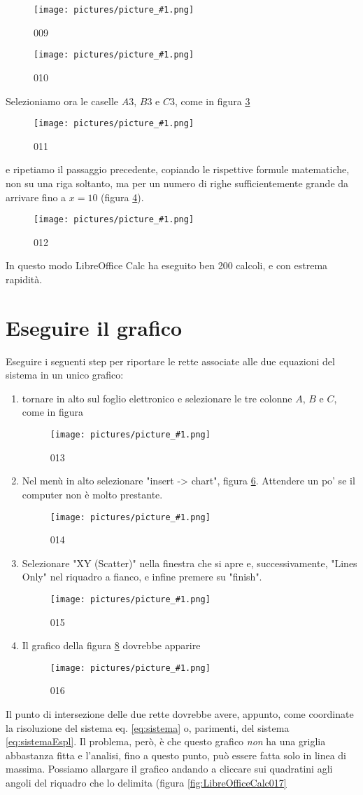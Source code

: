 \documentclass[17pt]{extarticle}
\newcommand{\pict}[1]{
\begin{figure}[h!]		
	\centering
   	\texttt{[image: pictures/picture\_\#1.png]}
  	\caption{#1}
   	\label{fig:LibreOfficeCalc#1}
\end{figure}
}
\begin{document}
%
\pict{009}

%
\pict{010}

Selezioniamo ora le caselle $A3$, $B3$ e $C3$, come in figura \ref{fig:LibreOfficeCalc011}

%
\pict{011}

e ripetiamo il passaggio precedente, copiando le rispettive formule matematiche, non su una riga soltanto, ma per un numero di righe sufficientemente grande da arrivare fino a $x = 10$ (figura \ref{fig:LibreOfficeCalc012}).

%
\pict{012}

In questo modo LibreOffice Calc ha eseguito ben 200 calcoli, e con estrema rapidità.

\newpage
\mbox{}
\newpage

\mbox{}
\newpage

\section{Eseguire il grafico}


Eseguire i seguenti step per riportare le rette associate alle due equazioni del sistema in un unico grafico:

\begin{enumerate}
	\item tornare in alto sul foglio elettronico e selezionare le tre colonne $A$, $B$ e $C$, come in figura 
	
	\pict{013}	
		
	\item Nel menù in alto selezionare "insert -> chart", figura \ref{fig:LibreOfficeCalc014}. Attendere un po' se il computer non è molto prestante.
	
	\pict{014}	
	
	\item Selezionare "XY (Scatter)" nella finestra che si apre e, successivamente, "Lines Only" nel riquadro a fianco, e infine premere su "finish".
	
	\pict{015}
	
	\item Il grafico della figura \ref{fig:LibreOfficeCalc016} dovrebbe apparire

	\pict{016}

\end{enumerate}
Il punto di intersezione delle due rette dovrebbe avere, appunto, come coordinate la risoluzione del sistema eq. \ref{eq:sistema} o, parimenti, del sistema \ref{eq:sistemaEspl}. Il problema, però, è che questo grafico \emph{non} ha una griglia abbastanza fitta e l'analisi, fino a questo punto, può essere fatta solo in linea di massima. Possiamo allargare il grafico andando a cliccare sui quadratini agli angoli del riquadro che lo delimita (figura \ref{fig:LibreOfficeCalc017}
\end{document}

